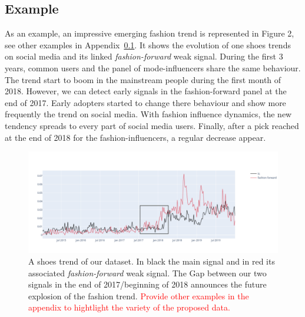 \documentclass{article} %
\begin{document}



\subsection{Example}

As an example, an impressive emerging fashion trend is represented in Figure 2, see other examples in Appendix~\ref{}. It shows the evolution of one shoes trends on social media and its linked \textit{fashion-forward} weak signal. During the first 3 years, common users and the panel of mode-influencers share the same behaviour. The trend start to boom in the mainstream people during the first month of 2018. However, we can detect early signals in the fashion-forward panel at the end of 2017. Early adopters started to change there behaviour and show more frequently the trend on social media. With fashion influence dynamics, the new tendency spreads to every part of social media users. Finally, after a pick reached at the end of 2018 for the fashion-influencers, a regular decrease appear. %

\begin{figure}
  \centering
    \includegraphics[width=1.\linewidth]{figure/emergering_trend.png}
  \caption{A shoes trend of our dataset. In black the main signal and in red its associated \textit{fashion-forward} weak signal. The Gap between our two signals in the end of 2017/beginning of 2018 announces the future explosion of the fashion trend. \textcolor{red}{Provide other examples in the appendix to hightlight the variety of the proposed data.}}
\end{figure}
\end{document}
